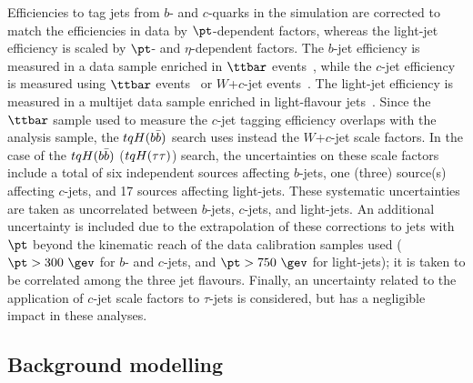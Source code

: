 Efficiencies to tag jets from $b$- and $c$-quarks in the simulation are corrected to match the efficiencies in data by $\pt$-dependent factors,
whereas the light-jet efficiency is scaled by $\pt$- and $\eta$-dependent factors.
The $b$-jet efficiency is measured in a data sample enriched in $\ttbar$ events~\cite{Aaboud:2018xwy}, while the $c$-jet efficiency is measured
using $\ttbar$ events~\cite{ATLAS-CONF-2018-001} or $W$+$c$-jet events~\cite{Aad:2015ydr}. 
The light-jet efficiency is measured in a multijet data sample enriched in light-flavour jets~\cite{ATLAS-CONF-2018-006}.
Since the $\ttbar$ sample used to measure the $c$-jet tagging efficiency overlaps with the analysis sample, the $tqH(b\bar{b})$ search uses
instead the $W$+$c$-jet scale factors.  
In the case of the $tqH(b\bar{b})$ ($tqH(\tau\tau)$) search, the uncertainties on these scale factors include a total of six independent sources affecting $b$-jets, one (three) source(s) affecting $c$-jets, and 17 sources affecting light-jets. 
These systematic uncertainties are taken as uncorrelated between $b$-jets, $c$-jets, and light-jets. 
An additional uncertainty is included due to the extrapolation of these corrections to jets 
with $\pt$ beyond the kinematic reach of the data calibration samples used ($\pt>300~\gev$ for $b$- and $c$-jets, 
and $\pt>750~\gev$ for light-jets); it is taken to be correlated among the three jet flavours. 
Finally, an uncertainty related to the application of $c$-jet scale factors to $\tau$-jets is considered,
but has a negligible impact in these analyses.

\subsection{Background modelling}
\label{sec:syst_bkgmodeling}

